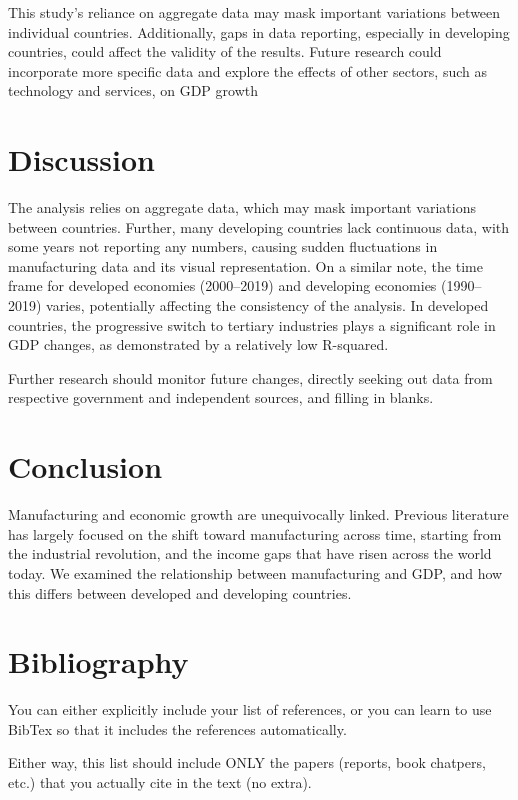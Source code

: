 \documentclass[12pt]{article}
\begin{document}
This study’s reliance on aggregate data may mask important variations between individual countries. Additionally, gaps in data reporting, especially in developing countries, could affect the validity of the results. Future research could incorporate more specific data and explore the effects of other sectors, such as technology and services, on GDP growth

\section{Discussion}
\label{sec:discussion}


The analysis relies on aggregate data, which may mask important variations between countries. Further, many developing countries lack continuous data, with some years not reporting any numbers, causing sudden fluctuations in manufacturing data and its visual representation. On a similar note, the time frame for developed economies (2000–2019) and developing economies (1990–2019) varies, potentially affecting the consistency of the analysis.
In developed countries, the progressive switch to tertiary industries plays a significant role in GDP changes, as demonstrated by a relatively low R-squared.

Further research should monitor future changes, directly seeking out data from respective government and independent sources, and filling in blanks.


\section{Conclusion}
\label{sec:conclusion}

Manufacturing and economic growth are unequivocally linked. Previous literature has largely focused on the shift toward manufacturing across time, starting from the industrial revolution, and the income gaps that have risen across the world today.  We examined the relationship between manufacturing and GDP, and how this differs between developed and developing countries.

\newpage
\section*{Bibliography}
\singlespacing
\setlength\bibsep{0pt}

You can either explicitly include your list of references, or you can learn to use BibTex so that it includes the references automatically.

Either way, this list should include ONLY the papers (reports, book chatpers, etc.) that you actually cite in the text (no extra).
\end{document}
